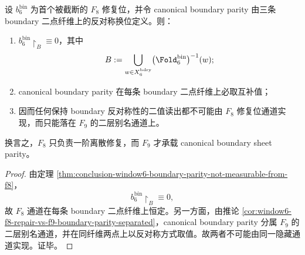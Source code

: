 \begin{theorem}\label{thm:conclusion-window6-boundary-f8-f9-channel-orthogonality}
设 \(b_6^{\mathrm{bin}}\) 为首个被截断的 \(F_8\) 修复位，并令 canonical boundary parity 由三条 boundary 二点纤维上的反对称换位定义。则：
\begin{enumerate}
  \item \(b_6^{\mathrm{bin}}\!\restriction_B\equiv 0\)，其中
  \[
  B:=\bigcup_{w\in X_6^{\mathrm{bdry}}}\bigl(\Fold_6^{\mathrm{bin}}\bigr)^{-1}(w);
  \]
  \item canonical boundary parity 在每条 boundary 二点纤维上必取互补值；
  \item 因而任何保持 boundary 反对称性的二值读出都不可能由 \(F_8\) 修复位通道实现，而只能落在 \(F_9\) 的二层别名通道上。
\end{enumerate}
换言之，\(F_8\) 只负责一阶离散修复，而 \(F_9\) 才承载 canonical boundary sheet parity。
\end{theorem}
\begin{proof}
由定理 \ref{thm:conclusion-window6-boundary-parity-not-measurable-from-f8}，
\[
b_6^{\mathrm{bin}}\!\restriction_B\equiv 0,
\]
故 \(F_8\) 通道在每条 boundary 二点纤维上恒定。另一方面，由推论 \ref{cor:window6-f8-repair-vs-f9-boundary-parity-separated}，canonical boundary parity 分属 \(F_9\) 的二层别名通道，并在同纤维两点上以反对称方式取值。故两者不可能由同一隐藏通道实现。证毕。
\end{proof}

